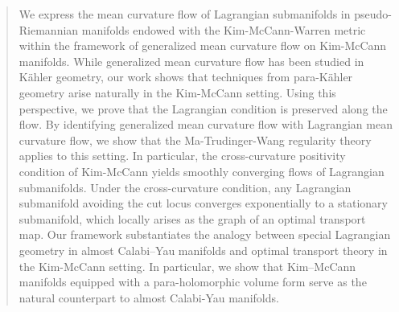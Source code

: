 \documentclass[12pt,letterpaper]{amsart}%
\numberwithin{mycounter}{section}
\theoremstyle{plain}
\numberwithin{equation}{section}
\theoremstyle{definition}
\begin{document}
\begin{abstract}




We express the mean curvature flow of Lagrangian submanifolds in pseudo-Riemannian manifolds endowed with the Kim-McCann-Warren metric within the framework of generalized mean curvature flow on Kim-McCann manifolds. While generalized mean curvature flow has been studied in Kähler geometry, our work shows that techniques from para-Kähler geometry arise naturally in the Kim-McCann setting. Using this perspective, we prove that the Lagrangian condition is preserved along the flow. By identifying generalized mean curvature flow with Lagrangian mean curvature flow, we show that the Ma-Trudinger-Wang regularity theory applies to this setting. In particular, the cross-curvature positivity condition of Kim-McCann yields smoothly converging flows of Lagrangian submanifolds. Under the cross-curvature condition, any Lagrangian submanifold avoiding the cut locus converges exponentially to a stationary submanifold, which locally arises as the graph of an optimal transport map. Our framework substantiates the analogy between special Lagrangian geometry in almost Calabi–Yau manifolds and optimal transport theory in the Kim-McCann setting. In particular, we show that Kim–McCann manifolds equipped with a para-holomorphic volume form serve as the natural counterpart to almost Calabi-Yau manifolds.




\end{abstract}
\end{document}
